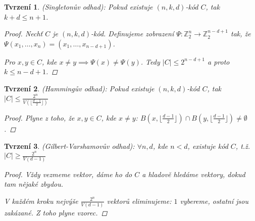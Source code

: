 \documentclass[10pt,a4paper]{article}
\newtheorem{tvrzeni}{Tvrzení}
\newcommand{\Z}{{\mathbb{Z}}}       %
\begin{document}
\begin{tvrzeni}(Singletonův odhad): \normalfont
    Pokud existuje $(n,k,d)$-kód $C$, tak $k+d \leq n+1$.
    \begin{proof}
        Nechť $C$ je $(n,k,d)$-kód. Definujeme zobrazení $\Psi: \Z_2^n \to \Z_2^{n-d+1}$ tak, že $\Psi(x_1, \dots, x_n) = (x_1, \dots, x_{n-d+1})$. 

        Pro $x,y\in C$, kde $x\neq y \implies \Psi(x) \neq \Psi(y)$. 
        Tedy $|C| \leq 2^{n-d+1}$ a proto $k \leq n-d+1$.
    \end{proof}
\end{tvrzeni}
\begin{tvrzeni}(Hammingův odhad): \normalfont
    Pokud existuje $(n,k,d)$-kód $C$, tak $\displaystyle |C| \leq \frac{2^n}{V(\lfloor \frac{d-1}{2}\rfloor)}$
    \begin{proof}
        Plyne z toho, že $x,y\in C$, kde $x\neq y$: $B(x, \lfloor \frac{d-1}{2}\rfloor) \cap B(y, \lfloor \frac{d-1}{2}\rfloor) \neq \emptyset$.
    \end{proof}
\end{tvrzeni}
\begin{tvrzeni}(Gilbert-Varshamovův odhad): \normalfont
    $\forall n,d$, kde $n<d$, existuje kód $C$, t.ž. $\displaystyle |C| \geq \frac{2^n}{V( d-1)}$
    \begin{proof}
        Vždy vezmeme vektor, dáme ho do $C$ a hladově hledáme vektory, dokud tam nějaké zbydou.

        V každém kroku nejvýše $\frac{2^n}{V(d-1)}$ vektorů eliminujeme: $1$ vybereme, ostatní jsou zakázané. Z toho plyne vzorec.
    \end{proof}
\end{tvrzeni}
\end{document}
